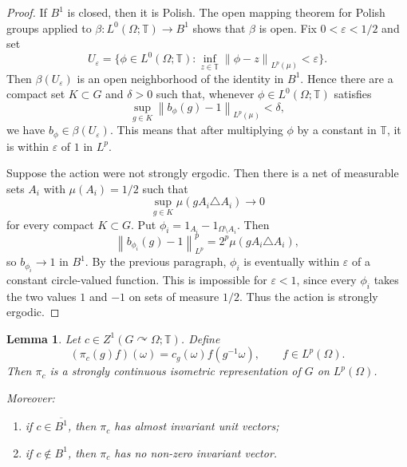 \documentclass[11pt]{article}
\newtheorem{lemma}{Lemma}
\theoremstyle{definition}
\newcommand{\T}{\mathbb T}
\newcommand{\norm}[1]{\left\lVert #1\right\rVert}
\begin{document}
\begin{proof}
If \(B^1\) is closed, then it is Polish.  The open mapping theorem for Polish
groups applied to \(\beta:L^0(\Omega;\T)\to B^1\) shows that \(\beta\) is
open.  Fix \(0<\varepsilon<1/2\) and set
\[
   U_\varepsilon=\{\phi\in L^0(\Omega;\T):
       \inf_{z\in\T}\norm{\phi-z}_{L^p(\mu)}<\varepsilon\}.
\]
Then \(\beta(U_\varepsilon)\) is an open neighborhood of the identity in
\(B^1\).  Hence there are a compact set \(K\subset G\) and \(\delta>0\) such
that, whenever \(\phi\in L^0(\Omega;\T)\) satisfies
\[
   \sup_{g\in K}\norm{b_\phi(g)-1}_{L^p(\mu)}<\delta,
\]
we have \(b_\phi\in \beta(U_\varepsilon)\).  This means that after multiplying
\(\phi\) by a constant in \(\T\), it is within \(\varepsilon\) of \(1\) in
\(L^p\).

Suppose the action were not strongly ergodic.  Then there is a net of
measurable sets \(A_i\) with \(\mu(A_i)=1/2\) such that
\[
   \sup_{g\in K}\mu(gA_i\triangle A_i)\to0
\]
for every compact \(K\subset G\).  Put
\(\phi_i=1_{A_i}-1_{\Omega\setminus A_i}\).  Then
\[
   \norm{b_{\phi_i}(g)-1}_{L^p}^p
   =2^p\mu(gA_i\triangle A_i),
\]
so \(b_{\phi_i}\to1\) in \(B^1\).  By the previous paragraph, \(\phi_i\) is
eventually within \(\varepsilon\) of a constant circle-valued function.  This
is impossible for \(\varepsilon<1\), since every \(\phi_i\) takes the two
values \(1\) and \(-1\) on sets of measure \(1/2\).  Thus the action is
strongly ergodic.
\end{proof}

\begin{lemma}\label{lem:twist}
Let \(c\in Z^1(G\curvearrowright\Omega;\T)\).  Define
\[
   (\pi_c(g)f)(\omega)=c_g(\omega)f(g^{-1}\omega),\qquad f\in L^p(\Omega).
\]
Then \(\pi_c\) is a strongly continuous isometric representation of \(G\) on
\(L^p(\Omega)\).

Moreover:
\begin{enumerate}
\item if \(c\in\overline{B^1}\), then \(\pi_c\) has almost invariant unit
vectors;
\item if \(c\notin B^1\), then \(\pi_c\) has no non-zero invariant vector.
\end{enumerate}
\end{lemma}
\end{document}
